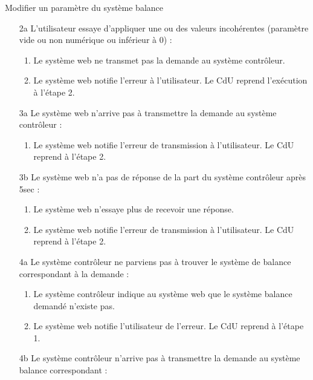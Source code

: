 \begin{UseCase}{Modifier un paramètre du système balance}
\begin{UseCaseExtension}
    \begin{enumerate}
        \item[2a] L'utilisateur essaye d'appliquer une ou des valeurs
            incohérentes (paramètre vide ou non numérique ou inférieur à 0) :
            \begin{enumerate}
                \item Le système web ne transmet pas la demande au système
                    contrôleur.
                \item Le système web notifie l'erreur à l'utilisateur. Le CdU
                    reprend l'exécution à l'étape 2.
            \end{enumerate}
        \item[3a] Le système web n'arrive pas à transmettre la demande au
            système contrôleur :
            \begin{enumerate}
                \item Le système web notifie l'erreur de transmission à
                    l'utilisateur. Le CdU reprend à l'étape 2.
            \end{enumerate}
        \item[3b] Le système web n'a pas de réponse de la part du système
            contrôleur après 5sec :
            \begin{enumerate}
                \item Le système web n'essaye plus de recevoir une réponse.
                \item Le système web notifie l'erreur de transmission à
                    l'utilisateur. Le CdU reprend à l'étape 2.
            \end{enumerate}
        \item[4a] Le système contrôleur ne parviens pas à trouver le système de
            balance correspondant à la demande :
            \begin{enumerate}
                \item Le système contrôleur indique au système web que le
                    système balance demandé n'existe pas.
                \item Le système web notifie l'utilisateur de l'erreur. Le CdU
                    reprend à l'étape 1.
            \end{enumerate}
        \item[4b] Le système contrôleur n'arrive pas à transmettre la demande
            au système balance correspondant :

\end{enumerate}
\end{UseCaseExtension}
\end{UseCase}
